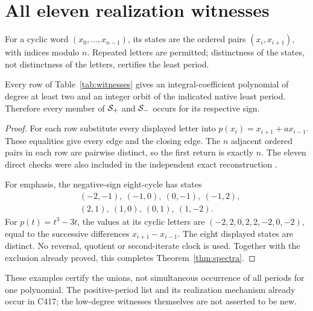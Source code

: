 \section{All eleven realization witnesses}\label{sec:witnesses}

For a cyclic word $(x_0,\ldots,x_{n-1})$, its states are the
ordered pairs $(x_i,x_{i+1})$, with indices modulo $n$. Repeated
letters are permitted; distinctness of the states, not distinctness
of the letters, certifies the least period.

\begin{proposition}[Realizability]\label{prop:witnesses}
Every row of Table~\ref{tab:witnesses} gives an integral-coefficient
polynomial of degree at least two and an integer orbit of the
indicated native least period. Therefore every member of $\mathcal S_+$
and $\mathcal S_-$ occurs for its respective sign.
\end{proposition}
\begin{proof}
For each row substitute every displayed letter into
$p(x_i)=x_{i+1}+a x_{i-1}$. These equalities give every edge and
the closing edge. The $n$ adjacent ordered pairs in each row are
pairwise distinct, so the first return is exactly $n$.
The eleven direct checks were also included in the independent
exact reconstruction \cite{IH6Review}.

For emphasis, the negative-sign eight-cycle has states
\begin{align*}
 &(-2,-1),\ (-1,0),\ (0,-1),\ (-1,2),\\
 &(2,1),\ (1,0),\ (0,1),\ (1,-2).
\end{align*}
For $p(t)=t^3-3t$, the values at its cyclic letters are
$(-2,2,0,2,2,-2,0,-2)$, equal to the successive differences
$x_{i+1}-x_{i-1}$. The eight displayed states are distinct.
No reversal, quotient or second-iterate clock is used. Together
with the exclusion already proved, this completes
Theorem~\ref{thm:spectra}.
\end{proof}



These examples certify the unions, not simultaneous occurrence
of all periods for one polynomial. The positive-period list and
its realization mechanism already occur in C417; the low-degree
witnesses themselves are not asserted to be new.
